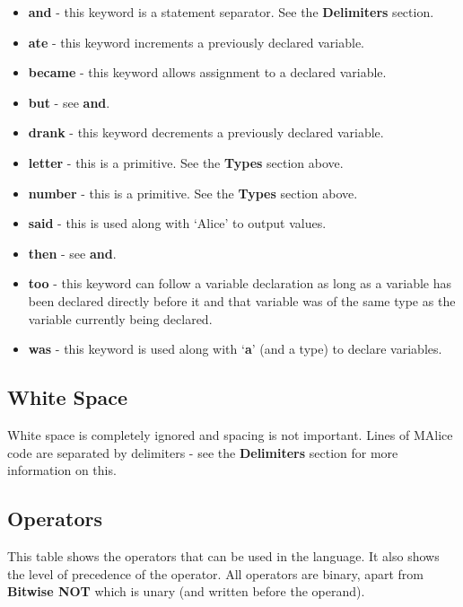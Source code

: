 \documentclass[a4, 11pt]{article}
\begin{document}
\begin{itemize}
  \item \textbf{and} - this keyword is a statement separator. See the \textbf{Delimiters} section.
  \item \textbf{ate} - this keyword increments a previously declared variable.
  \item \textbf{became} - this keyword allows assignment to a declared variable.
  \item \textbf{but} - see \textbf{and}.
  \item \textbf{drank} - this keyword decrements a previously declared variable.
  \item \textbf{letter} - this is a primitive. See the \textbf{Types} section above.
  \item \textbf{number} - this is a primitive. See the \textbf{Types} section above.
  \item \textbf{said} - this is used along with \textquoteleft Alice\textquoteright{} to output values.
  \item \textbf{then} - see \textbf{and}.
  \item \textbf{too} - this keyword can follow a variable declaration as long as a variable has been declared directly before it and that variable was of the same type as the variable currently being declared.
  \item \textbf{was} - this keyword is used along with \textquoteleft \textbf{a}\textquoteright{} (and a type) to declare variables.
\end{itemize}

\subsection*{White Space}
White space is completely ignored and spacing is not important. Lines of MAlice code are separated by delimiters - see the \textbf{Delimiters} section for more information on this.

\subsection*{Operators}
This table shows the operators that can be used in the language. It also shows the level of precedence of the operator. All operators are binary, apart from \textbf{Bitwise NOT} which is unary (and written before the operand).
\end{document}
